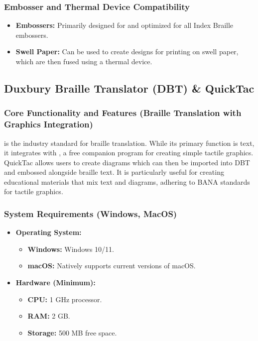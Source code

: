 \subsubsection{Embosser and Thermal Device Compatibility}\label{ch14:sssec:elpicsprint-compat}
\begin{itemize}
	\item \textbf{Embossers:} Primarily designed for and optimized for all Index Braille embossers.
	\item \textbf{Swell Paper:} Can be used to create designs for printing on swell paper, which are then fused using a thermal device.
\end{itemize}

\subsection{Duxbury Braille Translator (DBT) \& QuickTac}\label{ch14:ssec:dbt-quicktac}
\subsubsection{Core Functionality and Features (Braille Translation with Graphics Integration)}\label{ch14:sssec:dbt-features}
 is the industry standard for braille translation. While its primary function is text, it integrates with , a free companion program for creating simple tactile graphics. QuickTac allows users to create diagrams which can then be imported into DBT and embossed alongside braille text. It is particularly useful for creating educational materials that mix text and diagrams, adhering to BANA standards for tactile graphics.

\subsubsection{System Requirements (Windows, MacOS)}\label{ch14:sssec:dbt-sysreq}
\begin{itemize}
	\item \textbf{Operating System:}
	      \begin{itemize}
		      \item \textbf{Windows:} Windows 10/11.
		      \item \textbf{macOS:} Natively supports current versions of macOS.
	      \end{itemize}
	\item \textbf{Hardware (Minimum):}
	      \begin{itemize}
		      \item \textbf{CPU:} 1 GHz processor.
		      \item \textbf{RAM:} 2 GB.
		      \item \textbf{Storage:} 500 MB free space.
	      \end{itemize}
\end{itemize}

